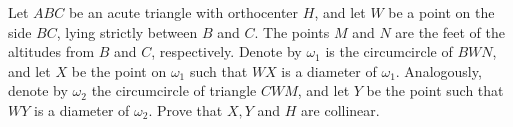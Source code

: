 Let $ABC$ be an acute triangle with orthocenter $H$,  and let $W$ be a point on the side $BC$,  lying strictly between $B$ and $C$. The points $M$ and $N$ are the feet of the altitudes from $B$ and $C$,  respectively. Denote by $\omega_1$ is the circumcircle of $BWN$,  and let $X$ be the point on $\omega_1$ such that $WX$ is a diameter of $\omega_1$. Analogously, denote by $\omega_2$ the circumcircle of triangle $CWM$,  and let $Y$ be the point such that $WY$ is a diameter of $\omega_2$. Prove that $X,Y$ and $H$ are collinear.